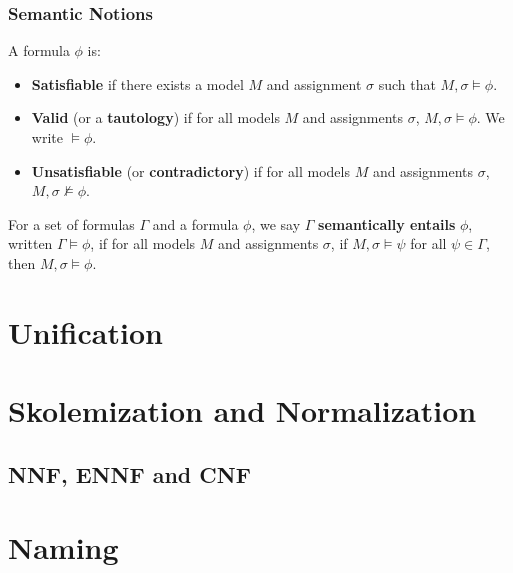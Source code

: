 \subsubsection{Semantic Notions}
A formula \(\phi\) is:
\begin{itemize}
  \item \textbf{Satisfiable} if there exists a model \(M\) and assignment \(\sigma\) such that \(M, \sigma \models \phi\).
  \item \textbf{Valid} (or a \textbf{tautology}) if for all models \(M\) and assignments \(\sigma\), \(M, \sigma \models \phi\). We write \(\models \phi\).
  \item \textbf{Unsatisfiable} (or \textbf{contradictory}) if for all models \(M\) and assignments \(\sigma\), \(M, \sigma \not\models \phi\).
\end{itemize}

For a set of formulas \(\Gamma\) and a formula \(\phi\), we say \(\Gamma\) \textbf{semantically entails} \(\phi\), written \(\Gamma \models \phi\), if for all models \(M\) and assignments \(\sigma\), if \(M, \sigma \models \psi\) for all \(\psi \in \Gamma\), then \(M, \sigma \models \phi\).

\section{Unification}

\section{Skolemization and Normalization}
\subsection{NNF, ENNF and CNF}

\section{Naming}


